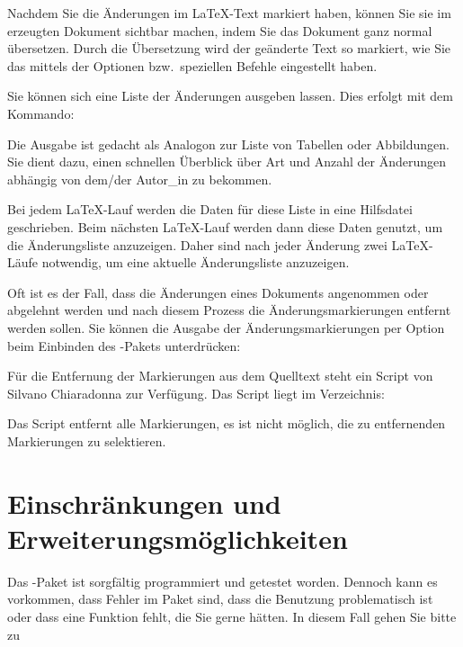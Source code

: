 Nachdem Sie die Änderungen im \LaTeX-Text markiert haben, können Sie sie im erzeugten Dokument sichtbar machen, indem Sie das Dokument ganz normal übersetzen.
Durch die Übersetzung wird der geänderte Text so markiert, wie Sie das mittels der Optionen bzw.\ speziellen Befehle eingestellt haben.


Sie können sich eine Liste der Änderungen ausgeben lassen.
Dies erfolgt mit dem Kommando:


Die Ausgabe ist gedacht als Analogon zur Liste von Tabellen oder Abbildungen.
Sie dient dazu, einen schnellen Überblick über Art und Anzahl der Änderungen abhängig von dem/der Autor\_in zu bekommen.

Bei jedem \LaTeX-Lauf werden die Daten für diese Liste in eine Hilfsdatei geschrieben.
Beim nächsten \LaTeX-Lauf werden dann diese Daten genutzt, um die Änderungsliste anzuzeigen.
Daher sind nach jeder Änderung zwei \LaTeX-Läufe notwendig, um eine aktuelle Änderungsliste anzuzeigen.


Oft ist es der Fall, dass die Änderungen eines Dokuments angenommen oder abgelehnt werden und nach diesem Prozess die Änderungsmarkierungen entfernt werden sollen.
Sie können die Ausgabe der Änderungsmarkierungen per Option beim Einbinden des -Pakets unterdrücken:



Für die Entfernung der Markierungen aus dem Quelltext steht ein Script von Silvano Chiaradonna zur Verfügung.
Das Script liegt im Verzeichnis:



Das Script entfernt alle Markierungen, es ist nicht möglich, die zu entfernenden Markierungen zu selektieren.

\section{Einschränkungen und Erweiterungsmöglichkeiten}
\label{sec:limitations}

Das -Paket ist sorgfältig programmiert und getestet worden.
Dennoch kann es vorkommen, dass Fehler im Paket sind, dass die Benutzung problematisch ist oder dass eine Funktion fehlt, die Sie gerne hätten.
In diesem Fall gehen Sie bitte zu

